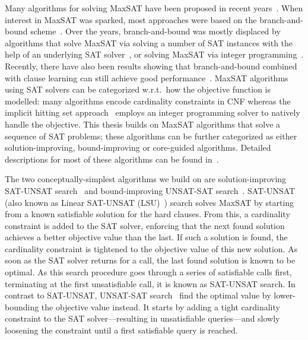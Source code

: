 Many algorithms for solving MaxSAT have been proposed in recent years~\autocites{DBLP:conf/sat/FuM06,DBLP:journals/jsat/BerreP10,DBLP:conf/cp/MorgadoDM14,DBLP:journals/jsat/IgnatievMM19,DBLP:conf/cp/DaviesB11,DBLP:conf/cp/LiXCMHH21}.
When interest in MaxSAT was sparked, most approaches were based on the branch-and-bound scheme~\autocites{handbook2-maxsat-old,DBLP:conf/sat/AlsinetMP05,DBLP:conf/cp/Planes03,DBLP:journals/jgo/AlsinetMP08,DBLP:journals/jair/HerasLO08}.
Over the years, branch-and-bound was mostly displaced by algorithms that solve MaxSAT via solving a number of SAT instances with the help of an underlying SAT solver~\autocite{handbook2-cdcl}, or solving MaxSAT via integer programming~\autocite{handbook2-maxsat}.
Recently, there have also been results showing that branch-and-bound combined with clause learning can still achieve good performance~\autocites{DBLP:conf/cp/LiXCMHH21,LiEtAl2021Boostingbranchbound}.
MaxSAT algorithms using SAT solvers can be categorized w.r.t.\ how the objective function is modelled:
many algorithms encode cardinality constraints in CNF whereas the implicit hitting set approach~\autocites{DBLP:conf/cp/DaviesB13,DBLP:conf/sat/DaviesB13,DBLP:conf/cp/DaviesB11,DBLP:conf/sat/BergBP20} employs an integer programming solver to natively handle the objective.
This thesis builds on MaxSAT algorithms that solve a sequence of SAT problems;
these algorithms can be further categorized as either solution-improving, bound-improving or core-guided algorithms.
Detailed descriptions for most of these algorithms can be found in~\autocite{handbook2-maxsat}.

The two conceptually-simplest algorithms we build on are solution-improving SAT-UNSAT search~\autocite{DBLP:journals/jsat/BerreP10} and bound-improving UNSAT-SAT search~\autocite{DBLP:conf/sat/FuM06}.
SAT-UNSAT (also known as Linear SAT-UNSAT (LSU)~\autocite{handbook2-maxsat}) search solves MaxSAT by starting from a known satisfiable solution for the hard clauses.
From this, a cardinality constraint is added to the SAT solver, enforcing that the next found solution achieves a better objective value than the last.
If such a solution is found, the cardinality constraint is tightened to the objective value of this new solution.
As soon as the SAT solver returns \unsat{} for a call, the last found solution is known to be optimal.
As this search procedure goes through a series of satisfiable calls first, terminating at the first unsatisfiable call, it is known as SAT-UNSAT search.
In contrast to SAT-UNSAT, UNSAT-SAT search~\autocites{DBLP:conf/sat/FuM06,DBLP:journals/tcad/XuRS03} find the optimal value by lower-bounding the objective value instead.
It starts by adding a tight cardinality constraint to the SAT solver---resulting in unsatisfiable queries---and slowly loosening the constraint until a first satisfiable query is reached.

